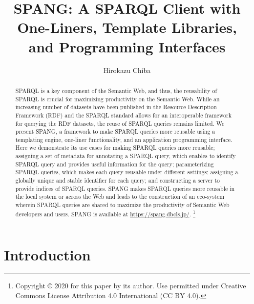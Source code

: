 \documentclass[runningheads]{llncs}
\newcommand\blfootnote[1]{%
  \begingroup
  \renewcommand\thefootnote{}\footnote{#1}%
  \addtocounter{footnote}{-1}%
  \endgroup
}
\begin{document}
\title{SPANG: A SPARQL Client with One-Liners, Template Libraries, and Programming Interfaces}
\author{Hirokazu Chiba}
%
\maketitle              %
%

\begin{abstract}
SPARQL is a key component of the Semantic Web, and thus, the reusability of SPARQL is crucial for maximizing productivity on the Semantic Web.
While an increasing number of datasets have been published in the Resource Description Framework (RDF) and the SPARQL standard allows for an interoperable framework for querying the RDF datasets, the reuse of SPARQL queries remains limited. We present SPANG, a framework to make SPARQL queries more reusable using a templating engine, one-liner functionality, and an application programming interface. Here we demonstrate its use cases for making SPARQL queries more reusable; assigning a set of metadata for annotating a SPARQL query, which enables to identify SPARQL query and provides useful information for the query; parameterizing SPARQL queries, which makes each query reusable under different settings; assigning a globally unique and stable identifier for each query; and constructing a server to provide indices of SPARQL queries. SPANG makes SPARQL queries more reusable in the local system or across the Web and leads to the construction of an eco-system wherein SPARQL queries are shared to maximize the productivity of Semantic Web developers and users. SPANG is available at \url{https://spang.dbcls.jp/}.
\blfootnote{Copyright © 2020 for this paper by its author. Use permitted under Creative Commons License Attribution 4.0 International (CC BY 4.0).}

\end{abstract}


\section{Introduction}
\end{document}
